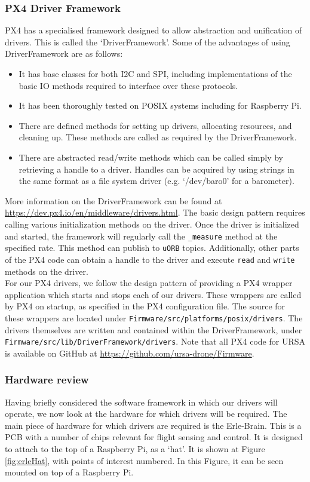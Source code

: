 \documentclass[capstone_report.tex]{subfiles}
\begin{document}
    \subsubsection{PX4 Driver Framework}
    PX4 has a specialised framework designed to allow abstraction and unification of drivers. This is called the `DriverFramework'. Some of the advantages of using DriverFramework are as follows:
    \begin{itemize}
        \item It has base classes for both I2C and SPI, including implementations of the basic IO methods required to interface over these protocols.
        \item It has been thoroughly tested on POSIX systems including for Raspberry Pi.
        \item There are defined methods for setting up drivers, allocating resources, and cleaning up. These methods are called as required by the DriverFramework.
        \item There are abstracted read/write methods which can be called simply by retrieving a handle to a driver. Handles can be acquired by using strings in the same format as a file system driver (e.g. `/dev/baro0' for a barometer).
    \end{itemize}

    More information on the DriverFramework can be found at \url{https://dev.px4.io/en/middleware/drivers.html}. The basic design pattern requires calling various initialization methods on the driver. Once the driver is initialized and started, the framework will regularly call the \texttt{\_measure} method at the specified rate. This method can publish to \texttt{uORB} topics. Additionally, other parts of the PX4 code can obtain a handle to the driver and execute \texttt{read} and \texttt{write} methods on the driver. \\

    For our PX4 drivers, we follow the design pattern of providing a PX4 wrapper application which starts and stops each of our drivers. These wrappers are called by PX4 on startup, as specified in the PX4 configuration file. The source for these wrappers are located under \texttt{Firmware/src/platforms/posix/drivers}. The drivers themselves are written and contained within the DriverFramework, under \texttt{Firmware/src/lib/DriverFramework/drivers}. Note that all PX4 code for URSA is available on GitHub at \url{https://github.com/ursa-drone/Firmware}.

    \subsubsection{Hardware review}
    Having briefly considered the software framework in which our drivers will operate, we now look at the hardware for which drivers will be required. The main piece of hardware for which drivers are required is the Erle-Brain. This is a PCB with a number of chips relevant for flight sensing and control. It is designed to attach to the top of a Raspberry Pi, as a `hat'. It is shown at Figure \ref{fig:erleHat}, with points of interest numbered. In this Figure, it can be seen mounted on top of a Raspberry Pi.
\end{document}
